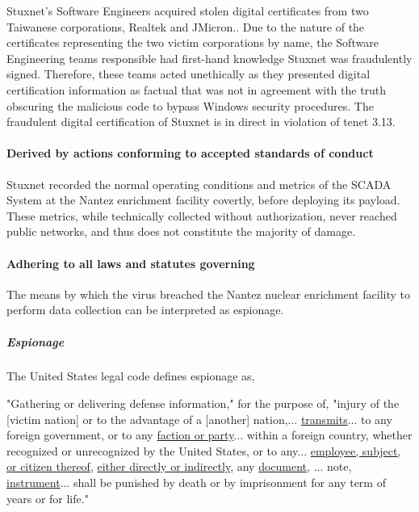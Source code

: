\documentclass[12pt]{article}
\begin{document}
\begin{multicols}{2}
Stuxnet's Software Engineers acquired stolen digital certificates from two Taiwanese corporations, Realtek and JMicron.\cite{signedUsingCertificates}. Due to the nature of the certificates representing the two victim corporations by name, the Software Engineering teams responsible had first-hand knowledge Stuxnet was fraudulently signed. Therefore, these teams acted unethically as they presented digital certification information as factual that was not in agreement with the truth obscuring the malicious code to bypass Windows security procedures. The fraudulent digital certification of Stuxnet is in direct in violation of tenet 3.13.

\paragraph{Derived by actions conforming to accepted standards of conduct}

Stuxnet recorded the normal operating conditions and metrics of the SCADA System at the Nantez enrichment facility covertly, before deploying its payload. These metrics, while technically collected without authorization, never reached public networks, and thus does not constitute the majority of damage.

\paragraph{Adhering to all laws and statutes governing}

The means by which the virus breached the Nantez nuclear enrichment facility to perform data collection can be interpreted as espionage.

\subparagraph{Espionage}

The United States legal code defines espionage as,

\begin{displayquote}
"Gathering or delivering defense information," for the purpose of, "injury of the [victim nation] or to the advantage of a [another] nation,... \ul{transmits}... to any foreign government, or to any \ul{faction or party}... within a foreign country, whether recognized or unrecognized by the United States, or to any... \ul{employee, subject, or citizen thereof}, \ul{either directly or indirectly}, any \ul{document}, ... note, \ul{instrument}... shall be punished by death or by imprisonment for any term of years or for life."\cite{USEspionageLegalDefinition}
\end{displayquote}


\end{multicols}
\end{document}
